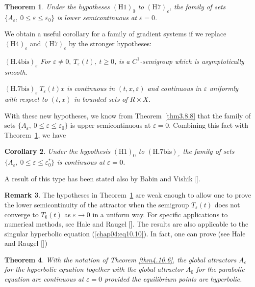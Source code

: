 \documentclass{surv-l}
\theoremstyle{plain}
\newtheorem{theorem}{Theorem}[section]
\newtheorem{corollary}[theorem]{Corollary}
\theoremstyle{definition}
\newtheorem{remark}[theorem]{Remark}
\numberwithin{equation}{section}
\numberwithin{figure}{chapter}
\begin{document}
\begin{theorem}\label{thm4.10.8} Under the hypotheses $\mathrm{(H1)}_{0}$ to $\mathrm{(H7)}_{\varepsilon}$, the family of sets $\{A_{\varepsilon},\ 0\leq\varepsilon \leq\varepsilon_{0}\}$ is lower semicontinuous at $\varepsilon=0$.
\end{theorem}

We obtain a useful corollary for a family of gradient systems if we replace $\mathrm{(H4)}_{\varepsilon}$ and $\mathrm{(H7)}_{\varepsilon}$ by the stronger hypotheses:

$\mathrm{(H.4bis)}_{\varepsilon}$ \emph{For $\varepsilon\neq 0,\ T_{\varepsilon}(t),\ t\geq 0$, is a $C^{1}$-semigroup which is asymptotically smooth}.

$\mathrm{(H.7bis)}_{\varepsilon}\ T_{\varepsilon}(t)x$ \emph{is continuous in $(t,x,\varepsilon)$ and continuous in $\varepsilon$ uniformly with respect to $(t,x)$ in bounded sets of} $R\times X$.

With these new hypotheses, we know from Theorem~\ref{thm3.8.8} that the family of sets $\{A_{\varepsilon},\ 0\leq\varepsilon \leq\varepsilon_{0}\}$ is upper semicontinuous at $\varepsilon =0$. Combining this fact with Theorem~\ref{thm4.10.8}, we have

\begin{corollary}\label{cor4.10.9} Under the hypothesis $\mathrm{(H1)}_{0}$ to $\mathrm{(H.7bis)}_{\varepsilon}$ the family of sets $\{A_{\varepsilon},\ 0\leq\varepsilon\leq\varepsilon_{0}^{\ast}\}$ is continuous at $\varepsilon =0$.
\end{corollary}

A result of this type has been stated also by Babin and Vishik [\citeyear{1986bv}].
\begin{remark}\label{rem4.10.10} The hypotheses in Theorem~\ref{thm4.10.8} are weak enough to allow one to prove the lower semicontinuity of the attractor when the semigroup $T_{\varepsilon}(t)$ does not converge to $T_{0}(t)$ as $\varepsilon\rightarrow 0$ in a uniform way. For specific applications to numerical methods, see Hale and Raugel [\citeyear{1988hra}]. The results are also applicable to the singular hyperbolic equation (\ref{chap04:eq10.10}). In fact, one can prove (see Hale and Raugel [\citeyear{1988hrb}])
\end{remark}

\begin{theorem}\label{thm4.10.11} With the notation of Theorem \emph{\ref{thm4.10.6}}, the global attractors $A_{\varepsilon}$ for the hyperbolic equation together with the global attractor $A_{0}$ for the parabolic equation are continuous at $\varepsilon =0$ provided the equilibrium points are hyperbolic.
\end{theorem}
\end{document}
